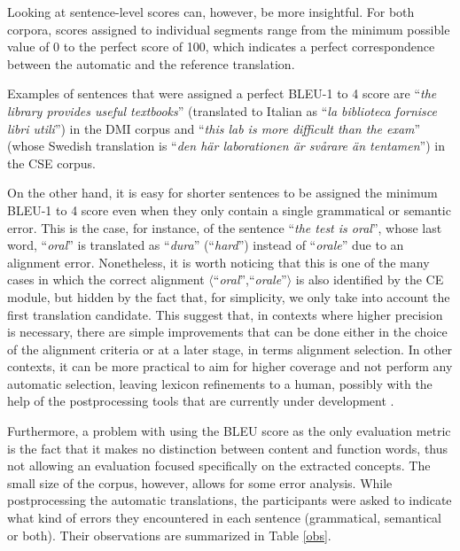 \documentclass[11pt]{article}
\begin{document}
Looking at sentence-level scores can, however, be more insightful. 
For both corpora, scores assigned to individual segments range from the minimum possible value of 0 to the perfect score of 100, which indicates a perfect correspondence between the automatic and the reference translation.

Examples of sentences that were assigned a perfect BLEU-1 to 4 score are ``\textit{the library provides useful textbooks}'' (translated to Italian as ``\textit{la biblioteca fornisce libri utili}'') in the DMI corpus and ``\textit{this lab is more difficult than the exam}'' (whose Swedish translation is ``\textit{den här laborationen är svårare än tentamen}'') in the CSE corpus. \smallskip

On the other hand, it is easy for shorter sentences to be assigned the minimum BLEU-1 to 4 score even when they only contain a single grammatical or semantic error. 
This is the case, for instance, of the sentence ``\textit{the test is oral}'', whose last word, ``\textit{oral}'' is translated as ``\textit{dura}'' (``\textit{hard}'') instead of ``\textit{orale}'' due to an alignment error. 
Nonetheless, it is worth noticing that this is one of the many cases in which the correct alignment $\langle$``\textit{oral}'',``\textit{orale}''$\rangle$ is also identified by the CE module, but hidden by the fact that, for simplicity, we only take into account the first translation candidate.
This suggest that, in contexts where higher precision is necessary, there are simple improvements that can be done either in the choice of the alignment criteria or at a later stage, in terms alignment selection. 
In other contexts, it can be more practical to aim for higher coverage and not perform any automatic selection, leaving lexicon refinements to a human, possibly with the help of the postprocessing tools that are currently under development \cite{TODO:}.

Furthermore, a problem with using the BLEU score as the only evaluation metric is the fact that it makes no distinction between content and function words, thus not allowing an evaluation focused specifically on the extracted concepts. 
The small size of the corpus, however, allows for some error analysis. 
While postprocessing the automatic translations, the participants were asked to indicate what kind of errors they encountered in each sentence (grammatical, semantical or both). 
Their observations are summarized in Table \ref{obs}.
\end{document}
